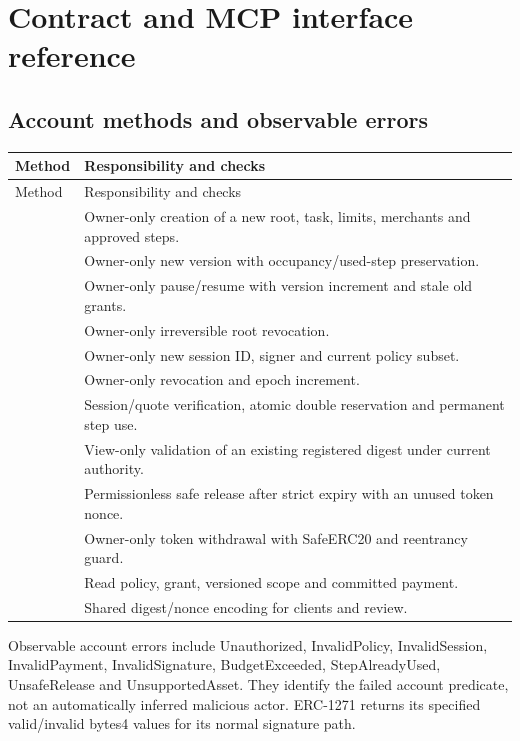\section{Contract and MCP interface reference}\label{app:interfaces}
\subsection{Account methods and observable errors}
\begin{longtable}{L{5.3cm}L{9.4cm}}\toprule
Method & Responsibility and checks\\\midrule\endfirsthead\toprule Method & Responsibility and checks\\\midrule\endhead
{} & Owner-only creation of a new root, task, limits, merchants and approved steps.\\
 & Owner-only new version with occupancy/used-step preservation.\\
 & Owner-only pause/resume with version increment and stale old grants.\\
 & Owner-only irreversible root revocation.\\
 & Owner-only new session ID, signer and current policy subset.\\
 & Owner-only revocation and epoch increment.\\
 & Session/quote verification, atomic double reservation and permanent step use.\\
 & View-only validation of an existing registered digest under current authority.\\
 & Permissionless safe release after strict expiry with an unused token nonce.\\
 & Owner-only token withdrawal with SafeERC20 and reentrancy guard.\\
 & Read policy, grant, versioned scope and committed payment.\\
 & Shared digest/nonce encoding for clients and review.\\\bottomrule
\end{longtable}

Observable account errors include Unauthorized, InvalidPolicy, InvalidSession, InvalidPayment, InvalidSignature, BudgetExceeded, StepAlreadyUsed, UnsafeRelease and UnsupportedAsset. They identify the failed account predicate, not an automatically inferred malicious actor. ERC-1271 returns its specified valid/invalid bytes4 values for its normal signature path.

